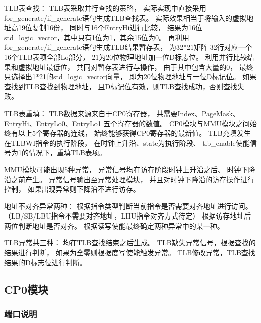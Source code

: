             TLB表查找：%
                TLB表采取并行查找的策略，%
                实际实现中直接采用for\_generate/if\_generate语句生成TLB查找表。%
                实际效果相当于将输入的虚拟地址高19位复制16份，%
                同时与16个EntryHi进行比较，%
                结果为16位std\_logic\_vector，其中只有1位为1，其余15位为0。%
                再利用for\_generate/if\_generate语句生成TLB结果暂存表，%
                为32*21矩阵%
                32行对应一个16个TLB表项全部Lo部分，%
                21为20位物理地址加一位D标志位。%
                利用并行比较结果和虚拟地址最低位，%
                共同对暂存表进行与操作，%
                由于其中包含大量的0，%
                最终只选择出1*21的std\_logic\_vector向量，%
                即为20位物理地址与一位D标记位。%
                如果查找到TLB查找到物理地址，%
                且D标记位有效，则TLB查找成功，否则查找失败。%
            
            TLB表重填：%
                TLB数据来源来自于CP0寄存器，%
                共需要Index、PageMask、EntryHi、EntryLo0、EntryLo1%
                五个寄存器的数值。%
                CP0模块与MMU模块之间始终有以上5个寄存器的连线，%
                始终能够获得CP0寄存器的最新值。%
                TLB充填发生在TLBWI指令的执行阶段，%
                在时钟上升沿、state为执行阶段、%
                tlb\_enable使能信号为1的情况下，重填TLB表项。%
            
            
            MMU模块可能出现5种异常，%
            异常信号均在访存阶段时钟上升沿之后、%
            时钟下降沿之前产生。%
            异常信号输出至异常处理模块，%
            并且对时钟下降沿的访存操作进行控制，%
            如果出现异常则下降沿不进行访存。%

            地址不对齐异常两种：%
                根据指令类型判断当前指令是否需要对齐地址进行访问。%
                （LB/SB/LBU指令不需要对齐地址，LHU指令对齐方式待定）%
                根据访存地址后两位判断地址是否对齐。%
                根据读写使能最终确定两种异常中的某一种。%

            TLB异常共三种：%
                均在TLB查找结束之后生成。%
                TLB缺失异常信号，根据查找的结果进行判断，%
                如果为全零则根据度写使能触发异常。%
                TLB修改异常，TLB查找结果的D标志位进行判断。%
        
    \subsection{CP0模块}
        \subsubsection{端口说明}
            
